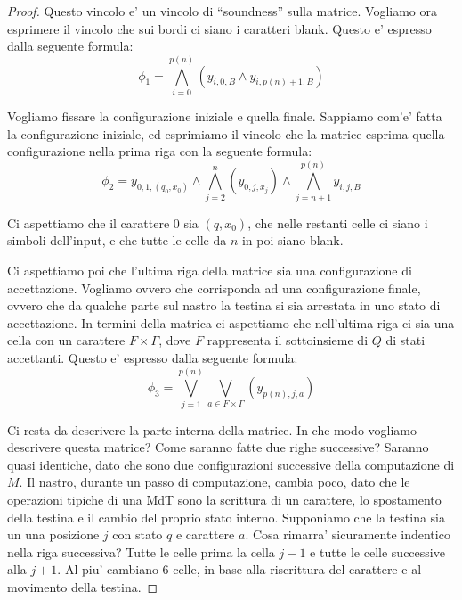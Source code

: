 \begin{proof}
    Questo vincolo e' un vincolo di ``soundness'' sulla matrice. Vogliamo ora esprimere il vincolo che
    sui bordi ci siano i caratteri blank. Questo e' espresso dalla seguente formula:
    \begin{equation*}
        \phi_{1} = \bigwedge_{i=0}^{p(n)}(y_{i,0,B} \land y_{i,p(n)+1,B})
    \end{equation*}

    Vogliamo fissare la configurazione iniziale e quella finale. Sappiamo com'e' fatta la configurazione
    iniziale, ed esprimiamo il vincolo che la matrice esprima quella configurazione nella prima riga con
    la seguente formula:
    \begin{equation*}
        \phi_{2} = y_{0,1,(q_{0},x_{0})} \land \bigwedge_{j=2}^{n}(y_{0,j,x_{j}}) \land
        \bigwedge_{j=n+1}^{p(n)}y_{i,j,B}
    \end{equation*}

    Ci aspettiamo che il carattere 0 sia $(q,x_{0})$, che nelle restanti celle ci siano i simboli
    dell'input, e che tutte le celle da $n$ in poi siano blank.

    Ci aspettiamo poi che l'ultima riga della matrice sia una configurazione di accettazione.
    Vogliamo ovvero che corrisponda ad una configurazione finale, ovvero che da qualche parte sul
    nastro la testina si sia arrestata in uno stato di accettazione. In termini della matrica ci
    aspettiamo che nell'ultima riga ci sia una cella con un carattere $F \times \Gamma$, dove $F$
    rappresenta il sottoinsieme di $Q$ di stati accettanti. Questo e' espresso dalla seguente
    formula:
    \begin{equation*}
        \phi_{3} = \bigvee_{j={1}}^{p(n)}\bigvee_{a \in F \times \Gamma}(y_{p(n),j,a})
    \end{equation*}

    Ci resta da descrivere la parte interna della matrice. In che modo vogliamo descrivere questa
    matrice? Come saranno fatte due righe successive? Saranno quasi identiche, dato che sono due
    configurazioni successive della computazione di $M$. Il nastro, durante un passo di
    computazione, cambia poco, dato che le operazioni tipiche di una MdT sono la scrittura di un
    carattere, lo spostamento della testina e il cambio del proprio stato interno. Supponiamo che la
    testina sia un una posizione $j$ con stato $q$ e carattere $a$. Cosa rimarra' sicuramente
    indentico nella riga successiva? Tutte le celle prima la cella $j-1$ e tutte le celle successive
    alla $j+1$. Al piu' cambiano 6 celle, in base alla riscrittura del carattere e al movimento
    della testina. 


\end{proof}
